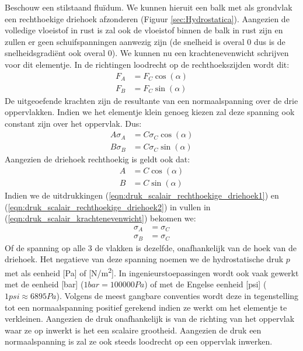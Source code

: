 Beschouw een stilstaand fluïdum. We kunnen hieruit een balk met als grondvlak een rechthoekige driehoek afzonderen (Figuur \ref{sec:Hydrostatica}). Aangezien de volledige vloeistof in rust is zal ook de vloeistof binnen de balk in rust zijn en zullen er geen schuifspanningen aanwezig zijn (de snelheid is overal 0 dus is de snelheidsgradiënt ook overal 0). We kunnen nu een krachtenevenwicht schrijven voor dit elementje. In de richtingen loodrecht op de rechthoekszijden wordt dit:
\begin{align}
	F_A &= F_C \cos(\alpha) \\
	F_B &= F_C \sin(\alpha)
\end{align}
De uitgeoefende krachten zijn de resultante van een normaalspanning over de drie oppervlakken. Indien we het elementje klein genoeg kiezen zal deze spanning ook constant zijn over het oppervlak. Dus:
\begin{align}
	A \sigma_A &= C \sigma_C \cos(\alpha) \\
	B \sigma_B &= C \sigma_C \sin(\alpha)
	\label{eqn:druk_scalair_krachtenevenwicht}
\end{align}
Aangezien de driehoek rechthoekig is geldt ook dat:
\begin{align}
	A &= C \cos(\alpha) 
	\label{eqn:druk_scalair_rechthoekige_driehoek1} \\
	B &= C \sin(\alpha)
	\label{eqn:druk_scalair_rechthoekige_driehoek2}
\end{align}
Indien we de uitdrukkingen (\ref{eqn:druk_scalair_rechthoekige_driehoek1}) en (\ref{eqn:druk_scalair_rechthoekige_driehoek2}) in vullen in (\ref{eqn:druk_scalair_krachtenevenwicht}) bekomen we:
\begin{align}
	\sigma_A &= \sigma_C \\
	\sigma_B &= \sigma_C
	\label{eqn:druk_scalair}
\end{align}
Of de spanning op alle 3 de vlakken is dezelfde, onafhankelijk van de hoek van de driehoek. Het negatieve van deze spanning noemen we de hydrostatische druk $p$ met als eenheid [Pa] of [\unit{N/m^2}]. In ingenieurstoepassingen wordt ook vaak gewerkt met de eenheid [bar] ($1\unit{bar} = 100000\unit{Pa}$) of met de Engelse eenheid [psi] ($1\unit{psi} \approx 6895\unit{Pa}$). Volgens de meest gangbare conventies wordt deze in tegenstelling tot een normaalspanning positief gerekend indien ze werkt om het elementje te verkleinen. Aangezien de druk onafhankelijk is van de richting van het oppervlak waar ze op inwerkt is het een scalaire grootheid. Aangezien de druk een normaalspanning is zal ze ook steeds loodrecht op een oppervlak inwerken.
